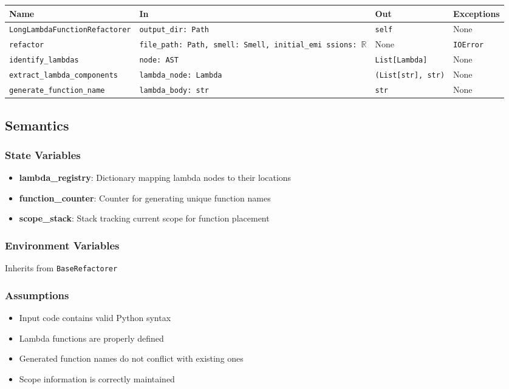 \documentclass[12pt, titlepage]{article}
\begin{document}
\begin{tabularx}{\linewidth}{|l|>{\raggedright\arraybackslash}X|l|l|}
\hline
\textbf{Name} & \textbf{In} & \textbf{Out} & \textbf{Exceptions} \\\hline
\texttt{LongLambdaFunctionRefactorer} & \texttt{output\_dir: Path} & \texttt{self} & None \\\hline
\texttt{refactor} & \texttt{file\_path: Path, smell: Smell, initial\_emi \allowbreak ssions: $\mathbb{R}$} & None & \texttt{IOError} \\\hline
\texttt{identify\_lambdas} & \texttt{node: AST} & \texttt{List[Lambda]} & None \\\hline
\texttt{extract\_lambda\_components} & \texttt{lambda\_node: Lambda} & \texttt{(List[str], str)} & None \\\hline
\texttt{generate\_function\_name} & \texttt{lambda\_body: str} & \texttt{str} & None \\\hline
\end{tabularx}

\subsection{Semantics}

\subsubsection{State Variables}
\begin{itemize}
  \item \textbf{lambda\_registry}: Dictionary mapping lambda nodes to their locations
  \item \textbf{function\_counter}: Counter for generating unique function names
  \item \textbf{scope\_stack}: Stack tracking current scope for function placement
\end{itemize}

\subsubsection{Environment Variables}
Inherits from \texttt{BaseRefactorer}

\subsubsection{Assumptions}
\begin{itemize}
  \item Input code contains valid Python syntax
  \item Lambda functions are properly defined
  \item Generated function names do not conflict with existing ones
  \item Scope information is correctly maintained
\end{itemize}
\end{document}
